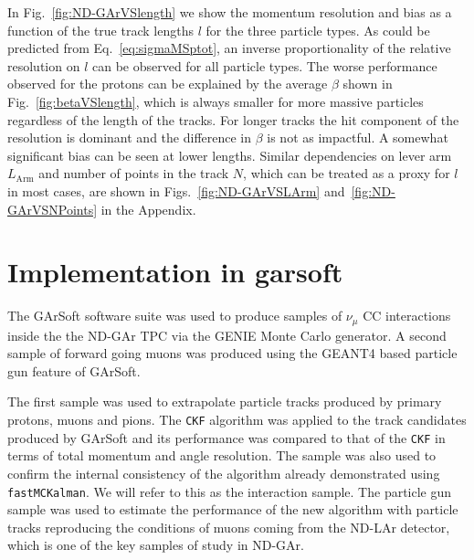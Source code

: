 In Fig.~\ref{fig:ND-GArVSlength} we show the momentum resolution and bias as a function of the true track lengths $l$ for the three particle types. As could be predicted from Eq.~\ref{eq:sigmaMSptot}, an inverse proportionality of the relative resolution on $l$ can be observed for all particle types. The worse performance observed for the protons can be explained by the average $\beta$ shown in Fig.~\ref{fig:betaVSlength}, which is always smaller for more massive particles regardless of the length of the tracks. For longer tracks the hit component of the resolution is dominant and the difference in $\beta$ is not as impactful. A somewhat significant bias can be seen at lower lengths. Similar dependencies on lever arm $L_{\textrm{Arm}}$ and number of points in the track $N$, which can be treated as a proxy for $l$ in most cases, are shown in Figs.~\ref{fig:ND-GArVSLArm} and~\ref{fig:ND-GArVSNPoints} in the Appendix.



\section{Implementation in garsoft}
\label{Sec:Garsoft_Implementation}
The GArSoft software suite was used to produce samples of $\nu_\mu$ CC interactions inside the the ND-GAr TPC via the GENIE Monte Carlo generator. A second sample of forward going muons was produced using the GEANT4 based particle gun feature of GArSoft.

The first sample was used to extrapolate particle tracks produced by primary protons, muons and pions. The \texttt{CKF} algorithm was applied to the track candidates produced by GArSoft and its performance was compared to that of the \texttt{CKF} in terms of total momentum and angle resolution. The sample was also used to confirm the internal consistency of the algorithm already demonstrated using \texttt{fastMCKalman}. We will refer to this as the interaction sample. The particle gun sample was used to estimate the performance of the new algorithm with particle tracks reproducing the conditions of muons coming from the ND-LAr detector, which is one of the key samples of study in ND-GAr.

